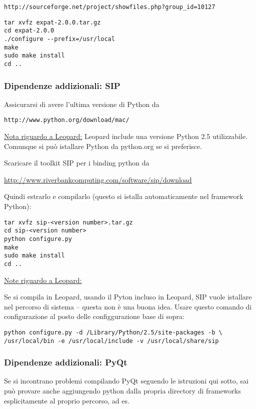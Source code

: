 \begin{verbatim}
http://sourceforge.net/project/showfiles.php?group_id=10127 
\end{verbatim}

\begin{verbatim}
tar xvfz expat-2.0.0.tar.gz 
cd expat-2.0.0 
./configure --prefix=/usr/local
make 
sudo make install 
cd ..  
\end{verbatim}

\subsubsection{Dipendenze addizionali: SIP}
Assicurarsi di avere l'ultima versione di Python da 

\begin{verbatim}
http://www.python.org/download/mac/
\end{verbatim}

\underline{Nota riguardo a Leopard:} Leopard include una versione Python 2.5 utilizzabile.  Comunque si può istallare  Python da python.org se si preferisce.

Scaricare il toolkit SIP per i binding python da

\url{http://www.riverbankcomputing.com/software/sip/download}

Quindi estrarlo e compilarlo (questo si istalla automaticamente nel framework Python):

\begin{verbatim}
tar xvfz sip-<version number>.tar.gz 
cd sip-<version number>
python configure.py 
make 
sudo make install 
cd ..  
\end{verbatim}

\underline{Note riguardo a Leopard:}

Se si compila in Leopard, usando il Pyton incluso in Leopard, SIP vuole istallare nel percorso di sistema -- questa non è una buona idea. Usare questo comando di configurazione al posto delle configgurazione base di sopra:

\begin{verbatim}
python configure.py -d /Library/Python/2.5/site-packages -b \
/usr/local/bin -e /usr/local/include -v /usr/local/share/sip
\end{verbatim}

\subsubsection{Dipendenze addizionali: PyQt}
Se si incontrano problemi compilando PyQt seguendo le istruzioni qui sotto, sai può provare anche aggiungendo python dalla propria directory di frameworks esplicitamente al proprio percorso, ad es.

